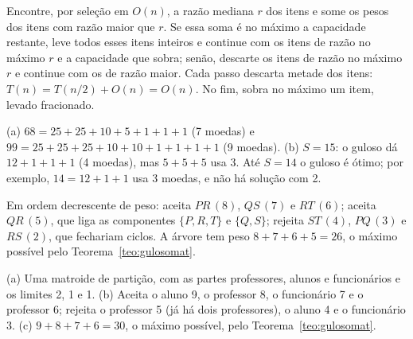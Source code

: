 Encontre, por seleção em $O(n)$, a razão mediana $r$ dos itens e some os pesos dos itens com razão maior que $r$. Se essa soma é no máximo a capacidade restante, leve todos esses itens inteiros e continue com os itens de razão no máximo $r$ e a capacidade que sobra; senão, descarte os itens de razão no máximo $r$ e continue com os de razão maior. Cada passo descarta metade dos itens: $T(n)=T(n/2)+O(n)=O(n)$. No fim, sobra no máximo um item, levado fracionado.

 (a) $68=25+25+10+5+1+1+1$ (7 moedas) e $99=25+25+25+10+10+1+1+1+1$ (9 moedas). (b) $S=15$: o guloso dá $12+1+1+1$ (4 moedas), mas $5+5+5$ usa 3. Até $S=14$ o guloso é ótimo; por exemplo, $14=12+1+1$ usa 3 moedas, e não há solução com 2.

 Em ordem decrescente de peso: aceita $PR\,(8)$, $QS\,(7)$ e $RT\,(6)$; aceita $QR\,(5)$, que liga as componentes $\{P,R,T\}$ e $\{Q,S\}$; rejeita $ST\,(4)$, $PQ\,(3)$ e $RS\,(2)$, que fechariam ciclos. A árvore tem peso $8+7+6+5=26$, o máximo possível pelo Teorema~\ref{teo:gulosomat}.

 (a) Uma matroide de partição, com as partes professores, alunos e funcionários e os limites 2, 1 e 1. (b) Aceita o aluno 9, o professor 8, o funcionário 7 e o professor 6; rejeita o professor 5 (já há dois professores), o aluno 4 e o funcionário 3. (c) $9+8+7+6=30$, o máximo possível, pelo Teorema~\ref{teo:gulosomat}.
